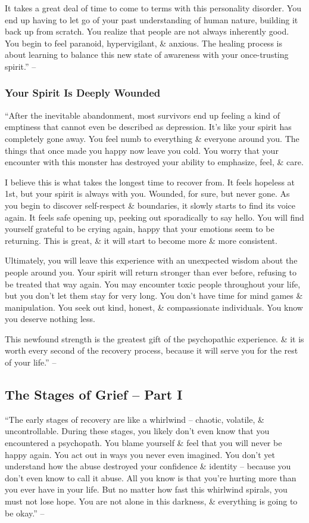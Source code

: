 \documentclass{article}
\numberwithin{equation}{section}
\begin{document}
It takes a great deal of time to come to terms with this personality disorder. You end up having to let go of your past understanding of human nature, building it back up from scratch. You realize that people are not always inherently good. You begin to feel paranoid, hypervigilant, \& anxious. The healing process is about learning to balance this new state of awareness with your once-trusting spirit.'' -- \cite[pp. 89--90]{MacKenzie2015}

\subsubsection{Your Spirit Is Deeply Wounded}
``After the inevitable abandonment, most survivors end up feeling a kind of emptiness that cannot even be described as depression. It's like your spirit has completely gone away. You feel numb to everything \& everyone around you. The things that once made you happy now leave you cold. You worry that your encounter with this monster has destroyed your ability to emphasize, feel, \& care.

I believe this is what takes the longest time to recover from. It feels hopeless at 1st, but your spirit is always with you. Wounded, for sure, but never gone. As you begin to discover self-respect \& boundaries, it slowly starts to find its voice again. It feels safe opening up, peeking out sporadically to say hello. You will find yourself grateful to be crying again, happy that your emotions seem to be returning. This is great, \& it will start to become more \& more consistent.

Ultimately, you will leave this experience with an unexpected wisdom about the people around you. Your spirit will return stronger than ever before, refusing to be treated that way again. You may encounter toxic people throughout your life, but you don't let them stay for very long. You don't have time for mind games \& manipulation. You seek out kind, honest, \& compassionate individuals. You know you deserve nothing less.

This newfound strength is the greatest gift of the psychopathic experience. \& it is worth every second of the recovery process, because it will serve you for the rest of your life.'' -- \cite[pp. 90--91]{MacKenzie2015}

\subsection{The Stages of Grief -- Part I}
``The early stages of recovery are like a whirlwind -- chaotic, volatile, \& uncontrollable. During these stages, you likely don't even know that you encountered a psychopath. You blame yourself \& feel that you will never be happy again. You act out in ways you never even imagined. You don't yet understand how the abuse destroyed your confidence \& identity -- because you don't even know to call it abuse. All you know is that you're hurting more than you ever have in your life. But no matter how fast this whirlwind spirals, you must not lose hope. You are not alone in this darkness, \& everything is going to be okay.'' -- \cite[p. 92]{MacKenzie2015}
\end{document}
